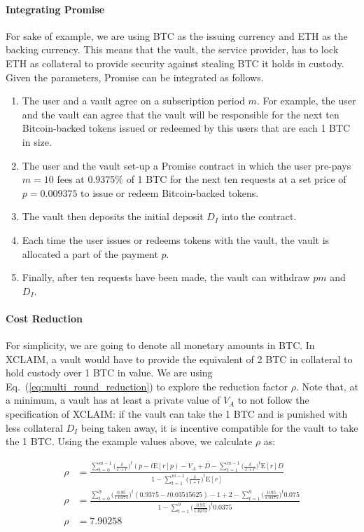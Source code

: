 \documentclass[runningheads]{llncs}
\newcommand{\sys}{Promise\xspace}
\begin{document}
\paragraph{Integrating Promise}
For sake of example, we are using BTC as the issuing currency and ETH as the backing currency.
This means that the vault, the service provider, has to lock ETH as collateral to provide security against stealing BTC it holds in custody.
Given the parameters, \sys can be integrated as follows.
\begin{enumerate}
    \item The user and a vault agree on a subscription period $m$. For example, the user and the vault can agree that the vault will be responsible for the next ten Bitcoin-backed tokens issued or redeemed by this users that are each 1 BTC in size.
    \item The user and the vault set-up a \sys contract in which the user pre-pays $m=10$ fees at 0.9375\% of 1 BTC for the next ten requests at a set price of $p=0.009375$ to issue or redeem Bitcoin-backed tokens.
    \item The vault then deposits the initial deposit $D_I$ into the contract.
    \item Each time the user issues or redeems tokens with the vault, the vault is allocated a part of the payment $p$.
    \item Finally, after ten requests have been made, the vault can withdraw $pm$ and $D_I$.
\end{enumerate}

\paragraph{Cost Reduction}
For simplicity, we are going to denote all monetary amounts in BTC.
In XCLAIM, a vault would have to provide the equivalent of 2 BTC in collateral to hold custody over 1 BTC in value.
We are using Eq.~(\ref{eq:multi_round_reduction}) to explore the reduction factor $\rho$.
Note that, at a minimum, a vault has at least a private value of $V_A$ to not follow the specification of XCLAIM: if the vault can take the 1 BTC and is punished with less collateral $D_I$ being taken away, it is incentive compatible for the vault to take the 1 BTC. Using the example values above, we calculate $\rho$ as:

\begin{equation}
\begin{split}
\rho &=  \frac{\sum_{t=0}^{m-1} \big( \frac{\delta}{1+r} \big)^{t} ( p - t\mathrm{E}[r]p)  - V_A + D - \sum_{t=1}^{m-1} \big( \frac{\delta}{1+r} \big)^{t} \mathrm{E}[r]D}{1 - \sum_{t=1}^{m-1} \big( \frac{\delta}{1+r} \big)^{t} \mathrm{E}[r]} \\
\rho &=  \frac{\sum_{t=0}^{9} \big( \frac{0.95}{1.0375} \big)^{t} ( 0.9375 - t 0.03515625)  - 1 + 2 - \sum_{t=1}^{9} \big( \frac{0.95}{1.0375} \big)^{t} 0.075}{1 - \sum_{t=1}^{9} \big( \frac{0.95}{1.0375} \big)^{t} 0.0375} \\
\rho &= 7.90258
\end{split}
\end{equation}
\end{document}
